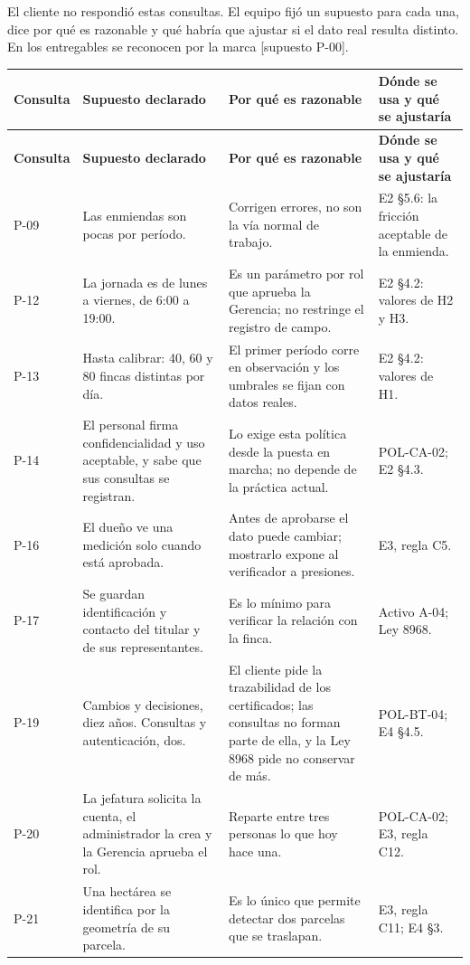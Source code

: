 \documentclass[11pt,letterpaper]{article}
\newcommand{\cab}[1]{\textbf{\rmfamily #1}}
\newcommand{\supu}[1]{\textrm{\footnotesize [supuesto #1]}}
\begin{document}
El cliente no respondió estas consultas. El equipo fijó un supuesto para cada una, dice por qué es
razonable y qué habría que ajustar si el dato real resulta distinto. En los entregables se reconocen
por la marca \supu{P-00}.

{\small
\renewcommand{\arraystretch}{1.22}
\begin{longtable}{@{}L{1.2cm} L{4.5cm} L{5.5cm} L{4.2cm}@{}}
\toprule
\cab{Consulta} & \cab{Supuesto declarado} & \cab{Por qué es razonable} & \cab{Dónde se usa y qué se ajustaría} \\
\midrule
\endfirsthead
\toprule
\cab{Consulta} & \cab{Supuesto declarado} & \cab{Por qué es razonable} & \cab{Dónde se usa y qué se ajustaría} \\
\midrule
\endhead
\bottomrule
\endfoot
P-09 & Las enmiendas son pocas por período. & Corrigen errores, no son la vía normal de trabajo. & E2 §5.6: la fricción aceptable de la enmienda. \\
P-12 & La jornada es de lunes a viernes, de 6:00 a 19:00. & Es un parámetro por rol que aprueba la Gerencia; no restringe el registro de campo. & E2 §4.2: valores de H2 y H3. \\
P-13 & Hasta calibrar: 40, 60 y 80 fincas distintas por día. & El primer período corre en observación y los umbrales se fijan con datos reales. & E2 §4.2: valores de H1. \\
P-14 & El personal firma confidencialidad y uso aceptable, y sabe que sus consultas se registran. & Lo exige esta política desde la puesta en marcha; no depende de la práctica actual. & POL-CA-02; E2 §4.3. \\
P-16 & El dueño ve una medición solo cuando está aprobada. & Antes de aprobarse el dato puede cambiar; mostrarlo expone al verificador a presiones. & E3, regla C5. \\
P-17 & Se guardan identificación y contacto del titular y de sus representantes. & Es lo mínimo para verificar la relación con la finca. & Activo A-04; Ley 8968. \\
P-19 & Cambios y decisiones, diez años. Consultas y autenticación, dos. & El cliente pide la trazabilidad de los certificados; las consultas no forman parte de ella, y la Ley 8968 pide no conservar de más. & POL-BT-04; E4 §4.5. \\
P-20 & La jefatura solicita la cuenta, el administrador la crea y la Gerencia aprueba el rol. & Reparte entre tres personas lo que hoy hace una. & POL-CA-02; E3, regla C12. \\
P-21 & Una hectárea se identifica por la geometría de su parcela. & Es lo único que permite detectar dos parcelas que se traslapan. & E3, regla C11; E4 §3. \\

\end{longtable}}
\end{document}
